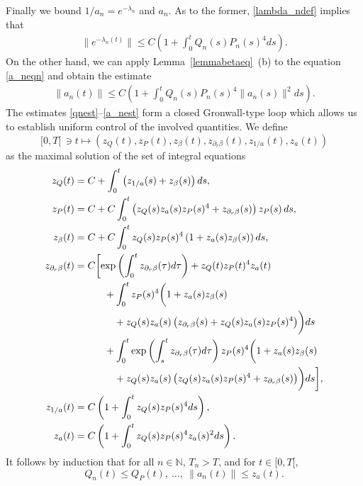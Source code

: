 \documentclass[11pt]{article}
\def\N{\mathbb N}
\begin{document}
Finally we bound $1/a_n = e^{-\lambda_n}$ and $a_n$. As to the former,
\eqref{lambda_ndef} implies that
\begin{align}\label{lambda_nest}
  \|e^{-\lambda_n(t)}\| \leq C \left(1+\int_0^t Q_n(s) P_n(s)^4 ds\right).
\end{align}
On the other hand, we can apply Lemma~\ref{lemmabetaeq}~(b) to the equation
\eqref{a_neqn} and obtain the estimate
\begin{align}\label{a_nest}
  \|a_n(t)\| \leq C \left(1+\int_0^t Q_n(s) P_n(s)^4 \|a_n(s)\|^2 ds\right).
\end{align}
The estimates \eqref{qnest}--\eqref{a_nest} form a closed Gronwall-type loop
which allows us to establish uniform control of the involved quantities.
We define
\[
  [0,T[\,\ni t\mapsto
      (z_Q(t), z_P(t), z_{\beta}(t), z_{\partial_r \beta}(t), z_{1/a}(t), z_a(t))
\]
as the maximal solution of the set of integral equations
\begin{align*}
  z_Q(t)
  &= C + \int_0^t \left(z_{1/a}(s) + z_\beta (s)\right) ds,\\
  z_P(t)
  &= C + C \int_0^t
  \left(z_Q(s) z_a(s) z_P(s)^4
  + z_{\partial_r\beta}(s)\right) z_P(s)\, ds,\\  
  z_\beta (t)
  &= C +
  C \int_0^t z_Q(s) z_P(s)^4 \left(1+z_a(s) z_\beta (s)\right) ds,\\
  z_{\partial_r \beta}(t)
  &=
  C \biggl[
    \exp\left(\int_0^t z_{\partial_r \beta} (\tau) d\tau\right)
    + z_Q(t) z_P(t)^4 z_a (t) \notag \\
    &\quad\qquad {}+ \int_0^t z_P(s)^4 \biggl(1+z_a(s) z_\beta (s)\\
    &\qquad\qquad + z_Q(s) z_a(s)
    \left(z_{\partial_r\beta}(s)+z_Q(s)z_a(s) z_P(s)^4\right)\biggr) ds\\
    &\quad\qquad {}+ \int_0^t
    \exp\left(\int_s^t z_{\partial_r \beta}(\tau) d\tau\right) z_P(s)^4
    \biggl(1+z_a(s) z_\beta (s)\\
    &\qquad\qquad
    + z_Q(s) z_a(s)
    \left(z_Q(s) z_a(s) z_P(s)^4
    +z_{\partial_r\beta}(s)\right)\biggr) ds \biggr],\\
  z_{1/a}(t)
  &= C \left(1+\int_0^t z_Q(s) z_P(s)^4 ds\right),\\
  z_a(t)
  &= C \left(1+\int_0^t z_Q(s) z_P(s)^4 z_a(s)^2 ds\right).
\end{align*}
It follows by induction that for all $n\in \N$, $T_n>T$, and for $t\in[0,T[$,
\[
Q_n(t)\leq Q_P(t),\ \ldots,\ \|a_n(t)\|\leq z_{a}(t).
\]
%
%
\end{document}
